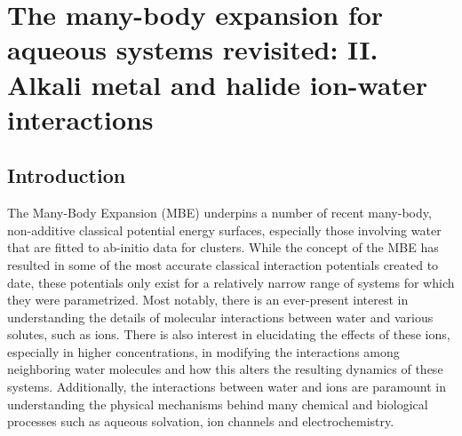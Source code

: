 \documentclass[11pt, proquest]{uwthesis}[2020/02/24]
\begin{document}
\chapter{The many-body expansion for aqueous systems revisited: II. Alkali metal and halide ion-water interactions}

\section{Introduction}
\par The Many-Body Expansion (MBE) underpins a number of recent many-body, non-additive classical potential energy surfaces, especially those involving water\autocite{burnham_development_2002,fanourgakis_flexible_2006,fanourgakis_development_2008,heindel_benchmark_2018,wang_flexible_2011,babin_development_2013,das_development_2019,gora_predictions_2014} that are fitted to ab-initio data for clusters. While the concept of the MBE has resulted in some of the most accurate classical interaction potentials created to date, these potentials only exist for a relatively narrow range of systems for which they were parametrized. Most notably, there is an ever-present interest in understanding the details of molecular interactions between water and various solutes, such as ions. There is also interest in elucidating the effects of these ions, especially in higher concentrations, in modifying the interactions among neighboring water molecules and how this alters the resulting dynamics of these systems. Additionally, the interactions between water and ions are paramount in understanding the physical mechanisms behind many chemical and biological processes such as aqueous solvation\autocite{makarov_solvation_2002,collins_ions_2004}, ion channels\autocite{pinto_influenza_1992,shearman_modulation_1989} and electrochemistry.\autocite{zhang_effects_2011,liu_doping_2006,tang_dynamic_2011}
\end{document}
